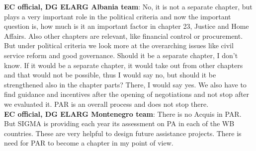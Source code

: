 \textbf{EC official, DG ELARG Albania team}: No, it is not a separate chapter, but plays a very important role in the political criteria and now the important question is, how much is it an important factor in chapter 23, Justice and Home Affairs. Also other chapters are relevant, like financial control or procurement. But under political criteria we look more at the overarching issues like civil service reform and good governance. Should it be a separate chapter, I don't know. If it would be a separate chapter, it would take out from other chapters and that would not be possible, thus I would say no, but should it be strengthened also in the chapter parts? There, I would say yes. We also have to find guidance and incentives after the opening of negotiations and not stop after we evaluated it. PAR is an overall process and does not stop there. \\
\textbf{EC official, DG ELARG Montenegro team}: There is no Acquis in PAR. But SIGMA is providing each year its assessment on PA in each of the WB countries. These are very helpful to design future assistance projects. There is need for PAR to become a chapter in my point of view.\\

